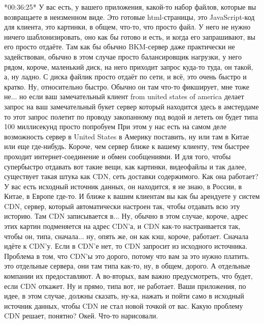 \documentclass[12pt]{article} %
\begin{document}
*00:36:25*
У вас есть, у вашего приложения, какой-то набор файлов, которые вы возвращаете в неизменном виде.  Это готовые html-страницы, это JavaScript-код для клиента, это картинки, в общем, что-то, что просто файл.  У него не нужно ничего шаблонизировать, оно как бы готово и есть, и когда его запрашивают, вы его просто отдаёте.  Там как бы обычно BKM-сервер даже практически не задействован, обычно в этом случае просто балансировщик нагрузки, у него рядом, короче, маленький диск, на него приходит запрос куда-то туда, он такой, а, ну ладно.  С диска файлик просто отдаёт по сети, и всё, это очень быстро и кратко.  Ну, относительно быстро.  Обычно он там что-то фикширует, мне тоже не...  но если ваш замечательный клиент from united states of america делает запрос на ваш замечательный букет сервер который находится здесь в амстердаме то этот запрос полетит по проводу закопанному под водой и лететь он будет типа 100 миллисекунд просто попробуем При этом у нас есть на самом деле возможность сервер в United States в Америку поставить, ну или там в Китае или еще где-нибудь.  Короче, чем сервер ближе к вашему клиенту, тем быстрее проходит интернет-соединение и обмен сообщениями.  И для того, чтобы супербыстро отдавать вот такие вещи, как картинки, видеофайлы и так далее, существует такая штука как CDN, сеть доставки содержимого.  Как она работает? У вас есть исходный источник данных, он находится, я не знаю, в России, в Китае, в Европе где-то.  И ближе к вашим клиентам вы как бы арендуете у систем CDN, сервер, который автоматически настроен так, чтобы отдавать всю эту историю.  Там CDN записывается в...  Ну, обычно в этом случае, короче, адрес этих картин подменяется на адрес CDN'а, и CDN как-то настраивается так, чтобы он, типа, сначала... ну, опять же, он как кэш, короче, работает.  Сначала идёте к CDN'у.  Если в CDN'е нет, то CDN запросит из исходного источника.  Проблема в том, что CDN'ы это дорого, потому что вам за это нужно платить.  это отдельные сервера, они там типа как-то, ну, в общем, дорого.  А отдельные компании их предоставляют.  А во-вторых, вам важно предусмотреть, что будет, если CDN откажет.  Ну и прямо, типа вот, не работает.  Ваши приложения, по идее, в этом случае, должны сказать, ну-ка, нажать и пойти само в исходный источник данных, чтобы CDN не стал новой точкой от вас.  Какую проблему CDN решает, понятно?  Окей.  Что-то нарисовали.
\end{document}
